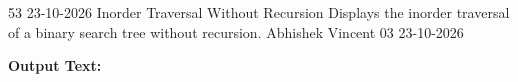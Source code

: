 \clearpage
\label{prog:53}
\programhead
  {53}
  {23-10-2026}
  {Inorder Traversal Without Recursion}
  {Displays the inorder traversal of a binary search tree without recursion.}
  {Abhishek Vincent}
  {03}
  {23-10-2026}

\divider
\textbf{Output Text:}\par
\vspace{2pt}

